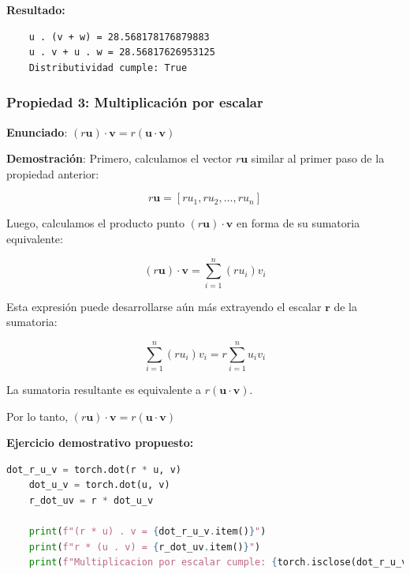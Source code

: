 \documentclass[12 pt]{article}
\begin{document}
\textbf{Resultado:}
\begin{lstlisting}
    u . (v + w) = 28.568178176879883
    u . v + u . w = 28.56817626953125
    Distributividad cumple: True
\end{lstlisting}


\subsubsection*{Propiedad 3: Multiplicación por escalar}

\begin{center}
\textbf{Enunciado}: \((r \mathbf{u}) \cdot \mathbf{v} = r (\mathbf{u} \cdot \mathbf{v})\)\\
\end{center}

\textbf{Demostración}: Primero, calculamos el vector \(r \mathbf{u}\) similar al primer paso de la propiedad anterior:

\[
r \mathbf{u} = [r u_1, r u_2, \dots, r u_n]
\]

Luego, calculamos el producto punto \((r \mathbf{u}) \cdot \mathbf{v}\) en forma de su sumatoria equivalente:

\[
(r \mathbf{u}) \cdot \mathbf{v} = \sum_{i=1}^{n} (r u_i) v_i
\]

Esta expresión puede desarrollarse aún más extrayendo el escalar \(\mathbf{r}\) de la sumatoria:

\[
\sum_{i=1}^{n} (r u_i) v_i = r \sum_{i=1}^{n} u_i v_i
\]

La sumatoria resultante es equivalente a \(r (\mathbf{u} \cdot \mathbf{v})\).

\begin{center}
Por lo tanto, \((r \mathbf{u}) \cdot \mathbf{v} = r (\mathbf{u} \cdot \mathbf{v})\)\\
\end{center}

\textbf{Ejercicio demostrativo propuesto:}
\begin{lstlisting}[language=Python]
    dot_r_u_v = torch.dot(r * u, v)
    dot_u_v = torch.dot(u, v)
    r_dot_uv = r * dot_u_v
    
    print(f"(r * u) . v = {dot_r_u_v.item()}")
    print(f"r * (u . v) = {r_dot_uv.item()}")
    print(f"Multiplicacion por escalar cumple: {torch.isclose(dot_r_u_v, r_dot_uv)}")
\end{lstlisting}
\end{document}
